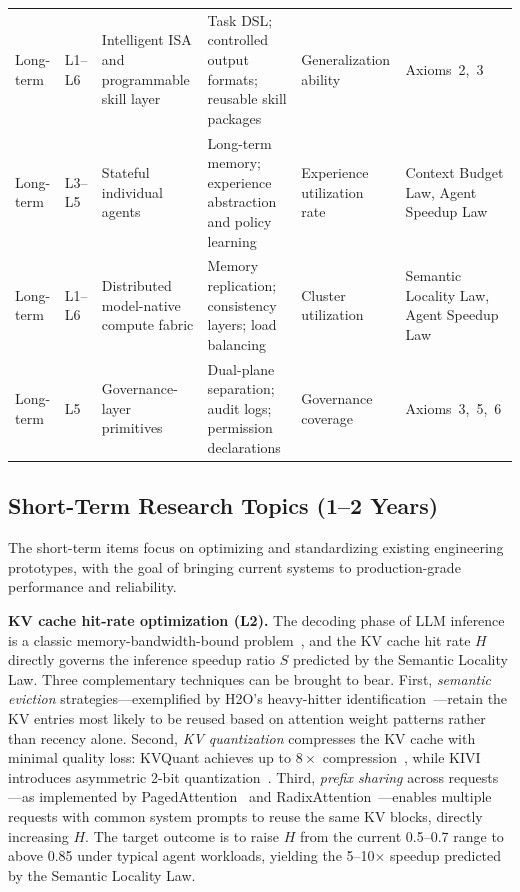 \documentclass[11pt,a4paper]{article}
\begin{document}
\begin{longtable}{p{}p{}p{}p{}p{}p{}}
Long-term & L1--L6 & Intelligent ISA and programmable skill layer & Task DSL; controlled output formats; reusable skill packages & Generalization ability & Axioms~2,~3 \\[3pt]
Long-term & L3--L5 & Stateful individual agents & Long-term memory; experience abstraction and policy learning & Experience utilization rate & Context Budget Law, Agent Speedup Law \\[3pt]
Long-term & L1--L6 & Distributed model-native compute fabric & Memory replication; consistency layers; load balancing & Cluster utilization & Semantic Locality Law, Agent Speedup Law \\[3pt]
Long-term & L5 & Governance-layer primitives & Dual-plane separation; audit logs; permission declarations & Governance coverage & Axioms~3,~5,~6 \\

\bottomrule
\end{longtable}
\renewcommand{\arraystretch}{1.0}
\normalsize

\subsection{Short-Term Research Topics (1--2 Years)}

The short-term items focus on optimizing and standardizing existing engineering prototypes, with the goal of bringing current systems to production-grade performance and reliability.

\textbf{KV cache hit-rate optimization (L2).}
The decoding phase of LLM inference is a classic memory-bandwidth-bound problem~\cite{gholami2024memorywall}, and the KV cache hit rate $H$ directly governs the inference speedup ratio $S$ predicted by the Semantic Locality Law.
Three complementary techniques can be brought to bear.
First, \textit{semantic eviction} strategies---exemplified by H2O's heavy-hitter identification~\cite{h2o2023}---retain the KV entries most likely to be reused based on attention weight patterns rather than recency alone.
Second, \textit{KV quantization} compresses the KV cache with minimal quality loss: KVQuant achieves up to $8\times$ compression~\cite{hooper2024kvquant}, while KIVI introduces asymmetric 2-bit quantization~\cite{liu2024kivi}.
Third, \textit{prefix sharing} across requests---as implemented by PagedAttention~\cite{kwon2023pagedattention} and RadixAttention~\cite{sglang2024}---enables multiple requests with common system prompts to reuse the same KV blocks, directly increasing $H$.
The target outcome is to raise $H$ from the current 0.5--0.7 range to above 0.85 under typical agent workloads, yielding the 5--10$\times$ speedup predicted by the Semantic Locality Law.
\end{document}
